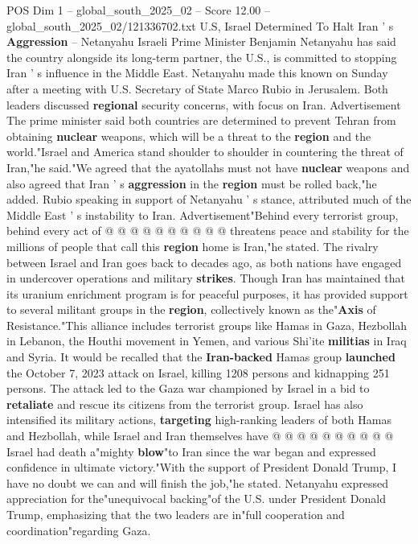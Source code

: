 \begin{textsample}{POS Dim 1 – global\_south\_2025\_02 – Score 12.00 – global\_south\_2025\_02/121336702.txt}  \label{ex:f1_pos_362}
U.S, Israel Determined To Halt Iran ' s \textbf{Aggression} -- Netanyahu Israeli Prime Minister Benjamin Netanyahu has said the country alongside its long-term partner, the U.S., is committed to stopping Iran ' s influence in the Middle East.
Netanyahu made this known on Sunday after a meeting with U.S.
Secretary of State Marco Rubio in Jerusalem.
Both leaders discussed \textbf{regional} security concerns, with focus on Iran.
Advertisement The prime minister said both countries are determined to prevent Tehran from obtaining \textbf{nuclear} weapons, which will be a threat to the \textbf{region} and the world."Israel and America stand shoulder to shoulder in countering the threat of Iran,"he said."We agreed that the ayatollahs must not have \textbf{nuclear} weapons and also agreed that Iran ' s \textbf{aggression} in the \textbf{region} must be rolled back,"he added.
Rubio speaking in support of Netanyahu ' s stance, attributed much of the Middle East ' s instability to Iran.
Advertisement"Behind every terrorist group, behind every act of @ @ @ @ @ @ @ @ @ @ threatens peace and stability for the millions of people that call this \textbf{region} home is Iran,"he stated.
The rivalry between Israel and Iran goes back to decades ago, as both nations have engaged in undercover operations and military \textbf{strikes}.
Though Iran has maintained that its uranium enrichment program is for peaceful purposes, it has provided support to several militant groups in the \textbf{region}, collectively known as the"\textbf{Axis} of Resistance."This alliance includes terrorist groups like Hamas in Gaza, Hezbollah in Lebanon, the Houthi movement in Yemen, and various Shi'ite \textbf{militias} in Iraq and Syria.
It would be recalled that the \textbf{Iran-backed} Hamas group \textbf{launched} the October 7, 2023 attack on Israel, killing 1208 persons and kidnapping 251 persons.
The attack led to the Gaza war championed by Israel in a bid to \textbf{retaliate} and rescue its citizens from the terrorist group.
Israel has also intensified its military actions, \textbf{targeting} high-ranking leaders of both Hamas and Hezbollah, while Israel and Iran themselves have @ @ @ @ @ @ @ @ @ @ Israel had death a"mighty \textbf{blow}"to Iran since the war began and expressed confidence in ultimate victory."With the support of President Donald Trump, I have no doubt we can and will finish the job,"he stated.
Netanyahu expressed appreciation for the"unequivocal backing"of the U.S. under President Donald Trump, emphasizing that the two leaders are in"full cooperation and coordination"regarding Gaza.

\end{textsample}
